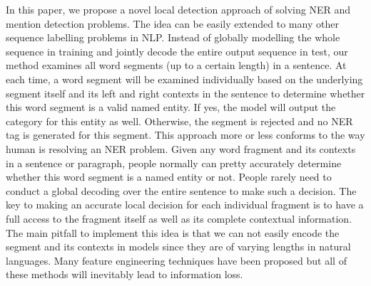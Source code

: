 \documentclass[11pt,a4paper]{article}
\begin{document}
In this paper, we propose a novel local detection approach of solving NER and mention detection problems. The idea can be easily extended to many other sequence labelling problems in NLP.  Instead of globally modelling the whole sequence in training and jointly decode the entire output sequence in test, 
our method examines all word segments (up to a certain length) in a sentence. At each time, a word segment will be examined individually based on the underlying segment itself and its left and right contexts in the sentence to determine whether this word segment is a valid named entity. If yes, the model will output the category for this entity as well. Otherwise, the segment is rejected and no NER tag is generated for this segment.
This approach more or less conforms to the way human is resolving an NER problem. Given any word fragment and its contexts in a sentence or paragraph, people normally can pretty accurately determine whether this word segment is a named entity or not. People rarely need to conduct a global decoding over the entire sentence to make such a decision. 
The key to making an accurate local decision for each individual fragment is to have a full access to the fragment itself as well as its complete contextual information. 
The main pitfall to implement this idea is that we can not easily encode the segment and its contexts in models since they are of varying lengths in natural languages. Many feature engineering techniques have been proposed but all of these methods will inevitably lead to information loss. 
\end{document}
